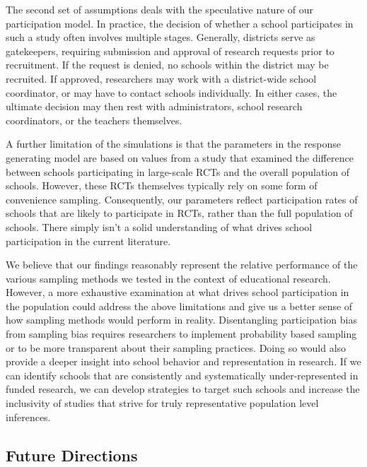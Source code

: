 \documentclass[english,man,floatsintext]{apa6}
\begin{document}
The second set of assumptions deals with the speculative nature of our participation model. In practice, the decision of whether a school participates in such a study often involves multiple stages. Generally, districts serve as gatekeepers, requiring submission and approval of research requests prior to recruitment. If the request is denied, no schools within the district may be recruited. If approved, researchers may work with a district-wide school coordinator, or may have to contact schools individually. In either cases, the ultimate decision may then rest with administrators, school research coordinators, or the teachers themselves.

A further limitation of the simulations is that the parameters in the response generating model are based on values from a study that examined the difference between schools participating in large-scale RCTs and the overall population of schools. However, these RCTs themselves typically rely on some form of convenience sampling. Consequently, our parameters reflect participation rates of schools that are likely to participate in RCTs, rather than the full population of schools. There simply isn't a solid understanding of what drives school participation in the current literature.

We believe that our findings reasonably represent the relative performance of the various sampling methods we tested in the context of educational research. However, a more exhaustive examination at what drives school participation in the population could address the above limitations and give us a better sense of how sampling methods would perform in reality. Disentangling participation bias from sampling bias requires researchers to implement probability based sampling or to be more transparent about their sampling practices. Doing so would also provide a deeper insight into school behavior and representation in research. If we can identify schools that are consistently and systematically under-represented in funded research, we can develop strategies to target such schools and increase the inclusivity of studies that strive for truly representative population level inferences.

\hypertarget{future-directions}{%
\subsection{Future Directions}\label{future-directions}}
\end{document}
